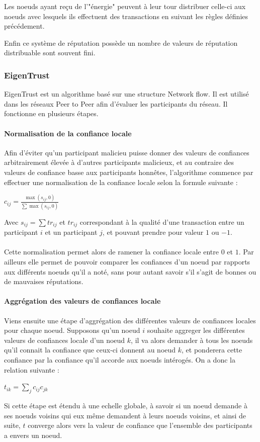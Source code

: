 \documentclass[a4paper, 11pt]{article} %
\begin{document}
Les noeuds ayant reçu de l'"énergie" peuvent à leur tour distribuer celle-ci aux noeuds avec lesquels ils effectuent des transactions en suivant les règles définies précédement.

Enfin ce système de réputation possède un nombre de valeurs de réputation distribuable sont souvent fini.

\subsubsection{EigenTrust}
EigenTrust est un algorithme basé sur une structure Network flow. Il est utilisé dans les réseaux Peer to Peer afin d'évaluer les participants du réseau.
Il fonctionne en plusieurs étapes.

\paragraph{Normalisation de la confiance locale}
Afin d'éviter qu'un participant malicieu puisse donner des valeurs de confiances arbitrairement élevée à d'autres participants malicieux, et au contraire des valeurs de confiance basse aux participants honnêtes, l'algorithme commence par effectuer une normalisation de la confiance locale selon la formule suivante :
\begin{center}
	$c_{ij} = \frac{\max{(s_{ij},0)}}{\sum \max{(s_{ij},0)}}$
\end{center}
Avec $s_{ij} = \sum tr_{ij}$ et $tr_{ij}$ correspondant à la qualité d'une transaction entre un participant $i$ et un participant $j$, et pouvant prendre pour valeur $1$ ou $-1$.
\paragraph{}
Cette normalisation permet alors de ramener la confiance locale entre $0$ et $1$.
Par ailleurs elle permet de pouvoir comparer les confiances d'un noeud par rapports aux différents noeuds qu'il a noté, sans pour autant savoir s'il s'agit de bonnes ou de mauvaises réputations.

\paragraph{Aggrégation des valeurs de confiances locale}
Viens ensuite une étape d'aggrégation des différentes valeurs de confiances locales pour chaque noeud.
Supposons qu'un noeud $i$ souhaite aggreger les différentes valeurs de confiances locale d'un noeud $k$, il va alors demander à tous les noeuds qu'il connait la confiance que ceux-ci donnent au noeud $k$, et ponderera cette confiance par la confiance qu'il accorde aux noeuds intérogés.
On a donc la relation suivante :
\begin{center}
	$t_{ik} = \sum_{j} c_{ij}c_{jk}$
\end{center}
Si cette étape est étendu à une echelle globale, à savoir si un noeud demande à ses noeuds voisins qui eux même demandent à leurs noeuds voisins, et ainsi de suite, $t$ converge alors vers la valeur de confiance que l'ensemble des participants a envers un noeud.
\end{document}
